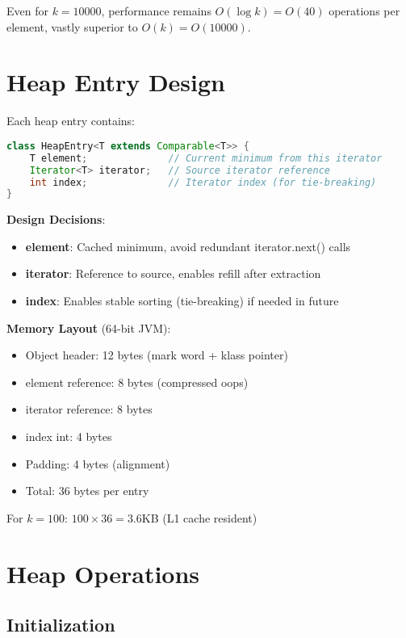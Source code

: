 \documentclass[11pt]{article}
\begin{document}
Even for $k = 10000$, performance remains $O(\log k) = O(40)$ operations per element, vastly superior to $O(k) = O(10000)$.

\section{Heap Entry Design}

Each heap entry contains:

\begin{lstlisting}[language=Java, basicstyle=\small\ttfamily]
class HeapEntry<T extends Comparable<T>> {
    T element;              // Current minimum from this iterator
    Iterator<T> iterator;   // Source iterator reference
    int index;              // Iterator index (for tie-breaking)
}
\end{lstlisting}

\textbf{Design Decisions}:
\begin{itemize}
    \item \textbf{element}: Cached minimum, avoid redundant iterator.next() calls
    \item \textbf{iterator}: Reference to source, enables refill after extraction
    \item \textbf{index}: Enables stable sorting (tie-breaking) if needed in future
\end{itemize}

\textbf{Memory Layout} (64-bit JVM):
\begin{itemize}
    \item Object header: 12 bytes (mark word + klass pointer)
    \item element reference: 8 bytes (compressed oops)
    \item iterator reference: 8 bytes
    \item index int: 4 bytes
    \item Padding: 4 bytes (alignment)
    \item Total: 36 bytes per entry
\end{itemize}

For $k = 100$: $100 \times 36 = 3.6$KB (L1 cache resident)

\section{Heap Operations}

\subsection{Initialization}
\end{document}

